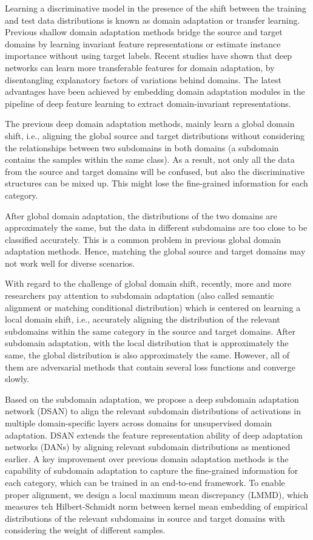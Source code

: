 \documentclass[conference]{IEEEtran}
\begin{document}
Learning a discriminative model in the presence of the shift between the training and test data distributions is known as domain adaptation or transfer learning. Previous shallow domain adaptation methods bridge the source and target domains by learning invariant feature representations or estimate instance importance without using target labels.
Recent studies have shown that deep networks can learn more transferable features for domain adaptation, by disentangling explanatory factors of variations behind domains.
The latest advantages have been achieved by embedding domain adaptation modules in the pipeline of deep feature learning to extract domain-invariant representations.

The previous deep domain adaptation methods, mainly learn a global domain shift, i.e., aligning the global source and target distributions without considering the relationships between two subdomains in both domains (a subdomain contains the samples within the same class).
As a result, not only all the data from the source and target domains will be confused, but also the discriminative structures can be mixed up.
This might lose the fine-grained information for each category. 

After global domain adaptation, the distributions of the two domains are approximately the same, but the data in different subdomains are too close to be classified accurately.
This is a common problem in previous global domain adaptation methods. Hence, matching the global source and target domains may not work well for diverse scenarios.

With regard to the challenge of global domain shift, recently, more and more researchers pay attention to subdomain adaptation (also called semantic alignment or matching conditional distribution) which is centered on learning a local domain shift, i.e., accurately aligning the distribution of the relevant subdomains within the same category in the source and target domains.
After subdomain adaptation, with the local distribution that is approximately the same, the global distribution is also approximately the same.
However, all of them are adversarial methods that contain several loss functions and converge slowly. 

Based on the subdomain adaptation, we propose a deep subdomain adaptation network (DSAN) to align the relevant subdomain distributions of activations in multiple domain-specific layers across domains for unsupervised domain adaptation.
DSAN extends the feature representation ability of deep adaptation networks (DANs) by aligning relevant subdomain distributions as mentioned earlier.
A key improvement over previous domain adaptation methods is the capability of subdomain adaptation to capture the fine-grained information for each category, which can be trained in an end-to-end framework.
To enable proper alignment, we design a local maximum mean discrepancy (LMMD), which measures teh Hilbert-Schmidt norm between kernel mean embedding of empirical distributions of the relevant subdomains in source and target domains with considering the weight of different samples.
\end{document}
